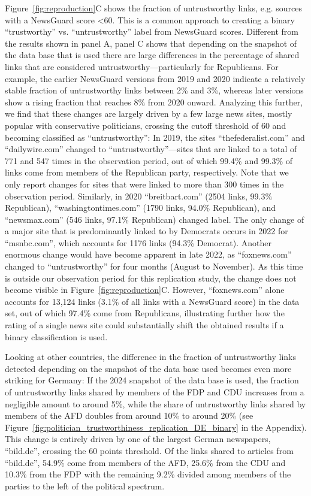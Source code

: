 \documentclass[12pt,twoside]{article}
\begin{document}
Figure~\ref{fig:reproduction}C shows the fraction of untrustworthy links, e.g. sources with a NewsGuard score <60. 
This is a common approach to creating a binary ``trustworthy'' vs. ``untrustworthy'' label from NewsGuard scores. 
Different from the results shown in panel A, panel C shows that depending on the snapshot of the data base that is used there are large differences in the percentage of shared links that are considered untrustworthy---particularly for Republicans. 
For example, the earlier NewsGuard versions from 2019 and 2020 indicate a relatively stable fraction of untrustworthy links between 2\% and 3\%, whereas later versions show a rising fraction that reaches 8\% from 2020 onward. 
Analyzing this further, we find that these changes are largely driven by a few large news sites, mostly popular with conservative politicians, crossing the cutoff threshold of 60 and becoming classified as ``untrustworthy'':
In 2019, the sites ``thefederalist.com'' and ``dailywire.com'' changed to ``untrustworthy''---sites that are linked to a total of 771 and 547 times in the observation period, out of which 99.4\% and 99.3\% of links come from members of the Republican party, respectively.
Note that we only report changes for sites that were linked to more than 300 times in the observation period.
Similarly, in 2020 ``breitbart.com'' (2504 links, 99.3\% Republican), ``washingtontimes.com'' (1790 links, 94.0\% Republican), and ``newsmax.com'' (546 links, 97.1\% Republican) changed label.
The only change of a major site that is predominantly linked to by Democrats occurs in 2022 for ``msnbc.com'', which accounts for 1176 links (94.3\% Democrat).
Another enormous change would have become apparent in late 2022, as ``foxnews.com'' changed to ``untrustworthy'' for four months (August to November). 
As this time is outside our observation period for this replication study, the change does not become visible in Figure~\ref{fig:reproduction}C.
However, ``foxnews.com'' alone accounts for 13,124 links (3.1\% of all links with a NewsGuard score) in the data set, out of which 97.4\% come from Republicans, illustrating further how the rating of a single news site could substantially shift the obtained results if a binary classification is used.

Looking at other countries, the difference in the fraction of untrustworthy links detected depending on the snapshot of the data base used becomes even more striking for Germany:
If the 2024 snapshot of the data base is used, the fraction of untrustworthy links shared by members of the FDP and CDU increases from a negligible amount to around 5\%, while the share of untrustworthy links shared by members of the AFD doubles from around 10\% to around 20\% (see Figure~\ref{fig:politician_trustworthiness_replication_DE_binary} in the Appendix).
This change is entirely driven by one of the largest German newspapers, ``bild.de'', crossing the 60 points threshold.
Of the links shared to articles from ``bild.de'', 54.9\% come from members of the AFD, 25.6\% from the CDU and 10.3\% from the FDP with the remaining 9.2\% divided among members of the parties to the left of the political spectrum.
\end{document}
